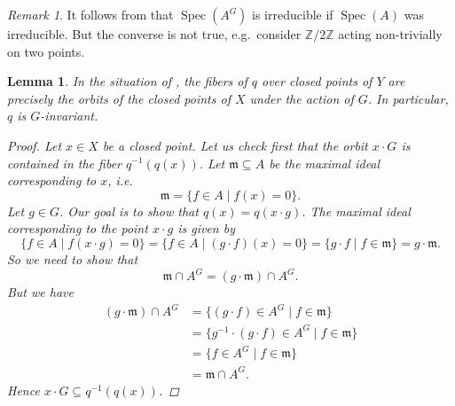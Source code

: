 \documentclass[12pt,a4paper]{amsart}
\theoremstyle{plain}
\newtheorem{lm}[thm]{Lemma}
\theoremstyle{definition}
\theoremstyle{remark}
\newtheorem{rem}[thm]{Remark}
\begin{document}
\begin{rem}\label{rem:irreducible}
  It follows from  that $\operatorname{Spec}(A^{G})$ is irreducible if $\operatorname{Spec}(A)$ was irreducible.
  But the converse is not true, e.g.~consider $\mathbb{Z}/2\mathbb{Z}$ acting non-trivially on two points.
\end{rem}

\begin{lm}\label{lm:fibers}
  In the situation of , the fibers of $q$ over closed points of $Y$ are precisely the orbits of the closed points of $X$ under the action of $G$.
  In particular, $q$ is $G$-invariant.

  \begin{proof}
    Let $x \in X$ be a closed point.
    Let us check first that the orbit $x \cdot G$ is contained in the fiber $q^{-1}(q(x))$.
    Let $\mathfrak{m} \subseteq A$ be the maximal ideal corresponding to $x$, i.e.
    \[ \mathfrak{m} = \{ f \in A \mid f(x) = 0 \}. \]
    Let $g \in G$.
    Our goal is to show that $q(x) = q(x \cdot g)$.
    The maximal ideal corresponding to the point $x \cdot g$ is given by
    \[ \{ f \in A \mid f(x \cdot g) = 0 \} = \{ f \in A \mid (g \cdot f)(x) = 0 \} = \{ g\cdot f \mid f \in \mathfrak{m} \} = g \cdot \mathfrak{m}. \]
    So we need to show that
    \[ \mathfrak{m} \cap A^{G} = (g \cdot \mathfrak{m}) \cap A^{G}. \]
    But we have
    \begin{align*}
      (g \cdot \mathfrak{m}) \cap A^{G} & = \{ (g \cdot f) \in A^{G} \mid f \in \mathfrak{m} \} \\
      & = \{ g^{-1} \cdot (g \cdot f) \in A^{G} \mid f \in \mathfrak{m} \} \\
      & = \{ f \in A^{G} \mid f \in \mathfrak{m} \} \\
      & = \mathfrak{m} \cap A^{G}. 
    \end{align*}
    Hence $x \cdot G \subseteq q^{-1}(q(x))$.


\end{proof}
\end{lm}
\end{document}
